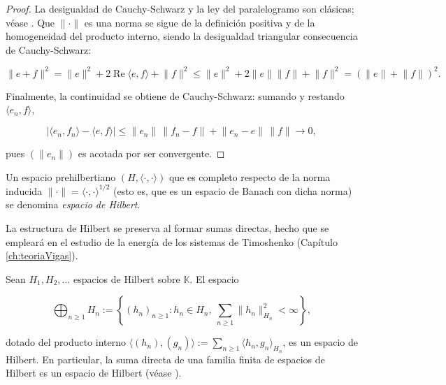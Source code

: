 \begin{proof}
La desigualdad de Cauchy-Schwarz y la ley del paralelogramo son clásicas; véase
\cite[I.1.4]{conway-1990-cou-fun-ana}. Que $\lVert \cdot \rVert$ es una norma se
sigue de la definición positiva y de la homogeneidad del producto interno, siendo
la desigualdad triangular consecuencia de Cauchy-Schwarz:

\[\lVert e + f \rVert^2 = \lVert e \rVert^2 + 2\operatorname{Re}\langle e, f \rangle + \lVert f \rVert^2 \leq \lVert e \rVert^2 + 2\lVert e \rVert \lVert f \rVert + \lVert f \rVert^2 = (\lVert e \rVert + \lVert f \rVert)^2.\]

Finalmente, la continuidad se obtiene de Cauchy-Schwarz: sumando y restando
$\langle e_n, f \rangle$,

\[|\langle e_n, f_n \rangle - \langle e, f \rangle| \leq \lVert e_n \rVert \, \lVert f_n - f \rVert + \lVert e_n - e \rVert \, \lVert f \rVert \rightarrow 0,\]

pues $(\lVert e_n \rVert)$ es acotada por ser convergente.
\end{proof}

\begin{Definicion}
\label{ch:preliminares:def:hilbert}

Un espacio prehilbertiano $(H, \langle \cdot, \cdot \rangle)$ que es completo
respecto de la norma inducida $\lVert \cdot \rVert = \langle \cdot, \cdot \rangle^{1/2}$
(esto es, que es un espacio de Banach con dicha norma) se denomina
\textit{espacio de Hilbert}.
\end{Definicion}

La estructura de Hilbert se preserva al formar sumas directas, hecho que se
empleará en el estudio de la energía de los sistemas de Timoshenko
(Capítulo \ref{ch:teoriaVigas}).\\

\begin{Proposicion}
\label{ch:preliminares:prop:sumaDirecta}

Sean $H_1, H_2, \ldots$ espacios de Hilbert sobre $\mathbb{K}$. El espacio

\[\bigoplus_{n \geq 1} H_n := \left\{ (h_n)_{n \geq 1} : h_n \in H_n, \ \sum_{n \geq 1} \lVert h_n \rVert_{H_n}^2 < \infty \right\},\]

dotado del producto interno
$\langle (h_n), (g_n) \rangle := \sum_{n \geq 1} \langle h_n, g_n \rangle_{H_n}$,
es un espacio de Hilbert. En particular, la suma directa de una familia finita de
espacios de Hilbert es un espacio de Hilbert
(véase \cite[Proposición~I.6.2]{conway-1990-cou-fun-ana}).
\end{Proposicion}


